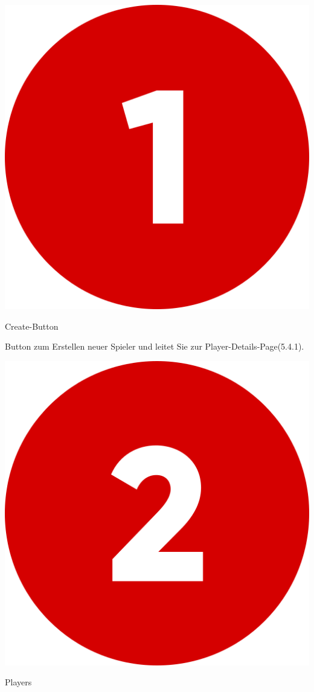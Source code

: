 \includegraphics[scale=0.05]{pics/user-guide/numbers/number-1.png} \begin{LARGE} Create-Button \end{LARGE}

Button zum Erstellen neuer Spieler und leitet Sie zur Player-Details-Page(5.4.1).

\bigskip
\includegraphics[scale=0.05]{pics/user-guide/numbers/number-2.png} \begin{LARGE} Players \end{LARGE}


